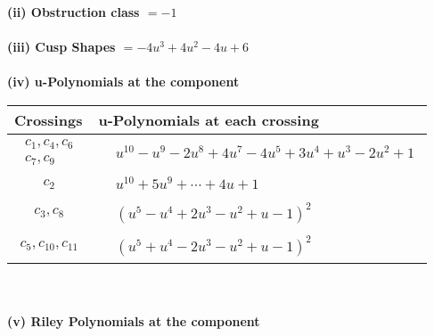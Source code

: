 \documentclass[1p]{elsarticle_modified}
\theoremstyle{definition}
\begin{document}
\flushleft \textbf{(ii) Obstruction class $= -1$}\\~\\
\flushleft \textbf{(iii) Cusp Shapes $= -4 u^3+4 u^2-4 u+6$}\\~\\
\newpage\renewcommand{\arraystretch}{1}
\flushleft \textbf{(iv) u-Polynomials at the component}\newline \\
\begin{tabular}{m{50pt}|m{274pt}}
Crossings & \hspace{64pt}u-Polynomials at each crossing \\
\hline $$\begin{aligned}c_{1},c_{4},c_{6}\\c_{7},c_{9}\end{aligned}$$&$\begin{aligned}
&u^{10}- u^9-2 u^8+4 u^7-4 u^5+3 u^4+u^3-2 u^2+1
\end{aligned}$\\
\hline $$\begin{aligned}c_{2}\end{aligned}$$&$\begin{aligned}
&u^{10}+5 u^9+\cdots+4 u+1
\end{aligned}$\\
\hline $$\begin{aligned}c_{3},c_{8}\end{aligned}$$&$\begin{aligned}
&(u^5- u^4+2 u^3- u^2+u-1)^2
\end{aligned}$\\
\hline $$\begin{aligned}c_{5},c_{10},c_{11}\end{aligned}$$&$\begin{aligned}
&(u^5+u^4-2 u^3- u^2+u-1)^2
\end{aligned}$\\
\hline
\end{tabular}\\~\\
\newpage\renewcommand{\arraystretch}{1}
\flushleft \textbf{(v) Riley Polynomials at the component}\newline \\
\end{document}
